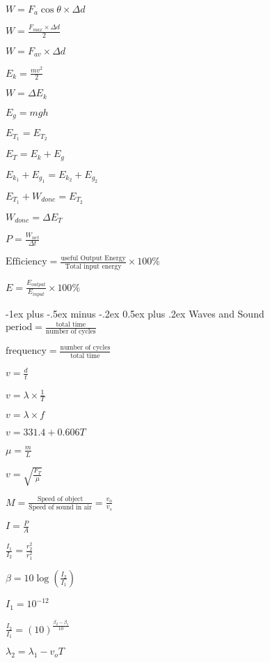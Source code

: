 \documentclass[10pt,landscape]{article}
\makeatletter
\newcommand{\lam}{\lambda}
\newcommand{\ti}{\times}
\renewcommand{\section}{\@startsection{section}{1}{0mm}%
                                {-1ex plus -.5ex minus -.2ex}%
                                {0.5ex plus .2ex}%
                                {\normalfont\large\bfseries}}
\makeatother
\begin{document}
\begin{multicols}{3}
    $W=F_a\cos\theta\ti\Delta d$

    $W=\frac{F_{max}\ti\Delta d}{2}$

    $W=F_{av}\ti\Delta d$

    $E_k=\frac{mv^2}{2}$

    $W=\Delta E_k$

    $E_g=mgh$

    $E_{T_1}=E_{T_2}$

    $E_T=E_k+E_g$

    $E_{k_1}+E_{g_1}=E_{k_2}+E_{g_2}$

    $E_{T_1}+W_{done}=E_{T_2}$

    $W_{done}=\Delta E_T$

    $P=\frac{W_{net}}{\Delta t}$

    $\text{Efficiency}=\frac{\text{useful Output Energy}}{\text{Total input energy}}\ti 100\%$

    $E=\frac{E_{output}}{E_{input}}\ti 100\%$

    \section{Waves and Sound}
    $\text{period}=\frac{\text{total time}}{\text{number of cycles}}$

    $\text{frequency}=\frac{\text{number of cycles}}{\text{total time}}$

    $v=\frac{d}{t}$

    $v=\lam\ti\frac{1}{T}$

    $v=\lam\ti f$

    $v=331.4+0.606T$

    $\mu=\frac{m}{L}$

    $v=\sqrt{\frac{F_T}{\mu}}$

    $M=\frac{\text{Speed of object}}{\text{Speed of sound in air}}=\frac{v_o}{v_s}$

    $I=\frac{P}{A}$

    $\frac{I_1}{I_2}=\frac{r_2^2}{r_1^2}$

    $\beta=10\log(\frac{I_2}{I_1})$

    $I_1=10^{-12}$

    $\frac{I_2}{I_1}=(10)^{\frac{\beta_2-\beta_1}{10}}$

    $\lam_2=\lam_1-v_oT$


\end{multicols}
\end{document}

